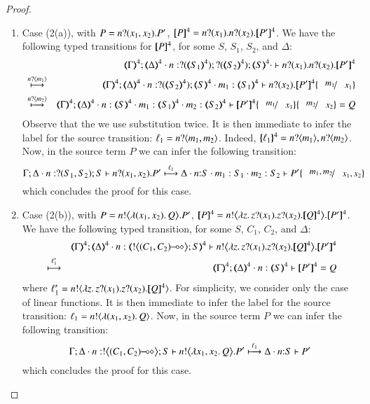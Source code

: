 \begin{proof}
\begin{enumerate}[$\bullet$]

\item Case (2(a)), with $P =  \binp{n}{x_1, x_2} P' $, 
$\map{P}^{4} = 
		\binp{n}{x_1}  \binp{n}{x_2}  \map{P'}^{4}$.
		We have  the following typed transitions for $\map{P}^{4}$, for some $S$, $S_1$, $S_2$, and $\Delta$:
\begin{eqnarray*}
& & \mapt{\Gamma}^{4}; 
\mapt{\Delta}^{4} \cat 
n:\btinp{\tmap{S_1}{4}}\btinp{\tmap{S_2}{4}}\tmap{S}{4} \cat
\proves 
\binp{n}{x_1} \binp{n}{x_2}\map{P'}^{4} \\
& \hby{\bactinp{n}{m_1}} & 
\mapt{\Gamma}^{4}; 
\mapt{\Delta}^{4} \cat 
n:\btinp{\tmap{S_2}{4}}\tmap{S}{4} \cat
m_1:\mapt{S_1}^{4}
\proves 
\binp{n}{x_2}\map{P'}^{4} \subst{m_1}{x_1} \\
& \hby{\bactinp{n}{m_2}} & 
\mapt{\Gamma}^{4}; 
\mapt{\Delta}^{4} \cat n:\tmap{S}{4} \cat
m_1:  \mapt{S_1}^{4} \cat
m_2: \mapt{S_2}^{4}
\proves 
\map{P'}^{4} \subst{m_1}{x_1}\subst{m_2}{x_2} = Q
\end{eqnarray*}
Observe that the we use substitution %
twice.
It is then immediate to infer the label for the source transition:
$\ell_1 = \bactinp{n}{m_1,m_2}$. Indeed, $\mapa{\ell_1}^{4} = \bactinp{n}{m_1}, \bactinp{n}{m_2}$.
Now, in the source term $P$ we can infer the following transition:
$$
\stytra{\Gamma}{\ell_1}{\Delta \cat n:\btinp{S_1, S_2}S}{\binp{n}{x_1, x_2} P' }{\Delta\cat n{:}S \cat m_1:S_1 \cat m_2:S_2}{P'\subst{m_1,m_2}{x_1, x_2}}
$$
which concludes the proof for this case.


\item Case (2(b)), with $P =  \bbout{n}{\abs{(x_1,x_2)} Q} P' $, 
$\map{P}^{4} = 
		\bbout{n}{\abs{z}\binp{z}{x_1}\binp{z}{x_2} \map{Q}^{4}} \map{P'}^{4}$.
		We have the following  typed transition, for some $S$, $C_1$, $C_2$, and $\Delta$:
\begin{eqnarray*}
& & \mapt{\Gamma}^{4}; 
\mapt{\Delta}^{4}\cat n:\tmap{\bbtout{\lhot{(C_1,  C_2)}} S}{4}
\proves 
\bbout{n}{\abs{z}\binp{z}{x_1}\binp{z}{x_2} \map{Q}^{4}} \map{P'}^{4} \\
& \hby{\ell'_1} & 
\mapt{\Gamma}^{4}; 
\mapt{\Delta}^{4}\cat n:\tmap{ S}{4} 
\proves 
\map{P'}^{4} = Q
\end{eqnarray*}
where
$\ell'_1 = \bactout{n}{\abs{z}\binp{z}{x_1} \binp{z}{x_2} \map{Q}^{4}}$.
For simplicity, we consider only the case of linear functions.
It is then immediate to infer the label for the source transition:
$\ell_1 = \bactout{n}{\abs{(x_1,  x_2)}{Q}} $. 
Now, in the source term $P$ we can infer the following transition:
$$
\stytra{\Gamma}{\ell_1}{\Delta\cat n:\bbtout{\lhot{(C_1,  C_2)}} S}{ \bbout{n}{\abs{x_1,x_2} Q} P'}{\Delta\cat n{:}S}{P'}
$$
which concludes the proof for this case.




\end{enumerate}
\end{proof}
